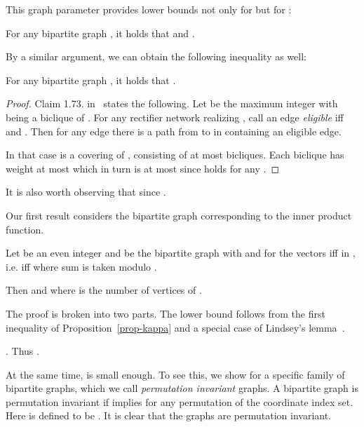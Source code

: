 \documentclass[submission]{llncs}
\begin{document}
  This graph parameter provides lower bounds not only for  but for :
  \begin{proposition}
  \label{prop-kappa}
  For any bipartite graph , it holds that  and .
  \end{proposition}
  By a similar argument, we can obtain the following inequality as well:
  \begin{proposition}
  \label{prop-cov-rect2kappa}
  For any bipartite graph , it holds that .
  \end{proposition}
  \begin{proof}
  Claim 1.73. in~\cite{JuknaChapter2013} states the following. Let  be the maximum integer with  being
  a biclique of . For any rectifier network  realizing , call an edge 
  \emph{eligible} iff  and . Then for any edge  there is a path from  to 
  in  containing an eligible edge.

In that case 
  is a covering of , consisting of at most  bicliques.
  Each biclique has weight at most  which in turn is
  at most  since  holds for any .
  \end{proof}

  It is also worth observing that 
  since .

  Our first result considers the bipartite graph corresponding to the  inner product function.
  \begin{theorem}
  \label{thm-orthogonal}
  Let  be an even integer and  be the bipartite graph with  and
   for the vectors  iff  in , i.e.
  iff  where sum is taken modulo .

  Then  and 
  where  is the number of vertices of .
  \end{theorem}

  The proof is broken into two parts. The lower bound follows from the first inequality of Proposition~\ref{prop-kappa}
  and a special case of Lindsey's lemma~\cite{DBLP:books/daglib/0028687}.
  \begin{proposition}
  \label{prop-bot-cov}
  . Thus .
  \end{proposition}
At the same time,  is small enough.
To see this, we show  for a specific family of bipartite graphs, which we call \emph{permutation invariant} graphs.
  A bipartite graph  is permutation invariant if  implies 
  for any permutation  of the coordinate index set. Here  is defined to be .
  It is clear that the graphs  are permutation invariant.
\end{document}
